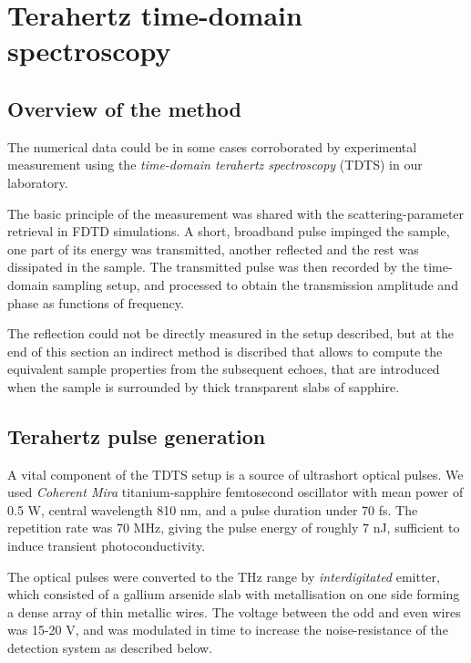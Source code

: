 
\section{Terahertz time-domain spectroscopy}
\subsection{Overview of the method}%
The numerical data could be in some cases corroborated by experimental measurement using the \textit{time-domain terahertz spectroscopy} (TDTS) in our laboratory. 

The basic principle of the measurement was shared with the scattering-parameter retrieval in FDTD simulations. %
 A short, broadband pulse impinged the sample, one part of its energy was transmitted, another reflected and the rest was dissipated in the sample. The transmitted pulse was then recorded by the time-domain sampling setup, and processed to obtain the transmission amplitude and phase as functions of frequency.

The reflection could not be directly measured in the setup described, but at the end of this section an indirect method is discribed that allows to compute the equivalent sample properties from the subsequent echoes, that are introduced when the sample is surrounded by thick transparent slabs of sapphire. 
\subsection{Terahertz pulse generation}%
A vital component of the TDTS setup is a source of ultrashort optical pulses. 
We used \textit{Coherent Mira} titanium-sapphire femtosecond oscillator with mean power of 0.5 W, central wavelength 810 nm, and a pulse duration under 70 fs.  %
The repetition rate was 70 MHz, giving the pulse energy of roughly 7 nJ, sufficient to induce transient photoconductivity.

The optical pulses were converted to the THz range by \textit{interdigitated} emitter, which consisted of a gallium arsenide slab %
with metallisation on one side forming a dense array of thin metallic wires. The voltage between the odd and even wires was 15-20 V, and was modulated in time to increase the noise-resistance of the detection system as described below.

